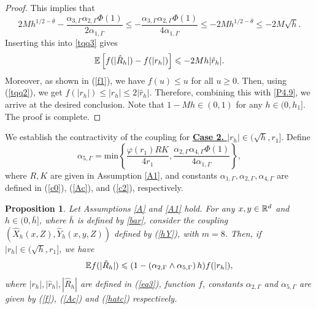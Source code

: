 \documentclass[aap]{imsart}
\theoremstyle{plain}
\newtheorem{proposition}{Proposition}
\theoremstyle{definition}
\begin{document}
\begin{proof}
This implies that
\begin{equation*}
2Mh^{1/2-\bar\theta}
-\frac{\alpha_{3,\Gamma}\alpha_{2, \Gamma}\Phi(1)}
{2\alpha_{1, \Gamma}}
\leqslant-\frac{\alpha_{3,\Gamma}\alpha_{2, \Gamma}\Phi(1)}
{4\alpha_{1, \Gamma}}\leqslant -2Mh^{1/2-\bar{\theta}}\leqslant -2M\sqrt{h}.
\end{equation*}
Inserting this into \eqref{tqq3} gives 
\begin{equation}\label{P4.9}
\mathbb{E} \left[f(|\hat{R}_h|)-f(|r_h|)\right]\leqslant -2Mh|\hat{r}_h|.
\end{equation}
Moreover, as shown in (\ref{f1}), we have $f(u)\leqslant u$ for all $u\geqslant 0$. Then, using (\ref{tqq2}), we get $f(|r_h|)\leqslant |r_h|\leqslant 2|\hat{r}_h|$.
Therefore, combining this with \eqref{P4.9}, we arrive at the desired conclusion. Note that $1-Mh\in(0, 1)$ for any $h\in(0, h_1]$. The proof is complete.
\end{proof}
			
We establish the contractivity of the coupling for \underline{\bf{Case 2. \textit{$|r_h|\in(\sqrt{h}, r_1]$}}}. Define 
\begin{equation}\label{hatc}
\alpha_{5, \Gamma}=\mathrm{min}\left\{\frac{\varphi(r_1)R K}{4r_1},\frac{\alpha_{2, \Gamma}\alpha_{4, \Gamma}\Phi(1)}{4\alpha_{1, \Gamma}}\right\},
\end{equation}
where \(R, K\) are given in Assumption \ref{A1}, and constants $\alpha_{1, \Gamma}, \alpha_{2, \Gamma}, \alpha_{4, \Gamma}$ are defined in (\ref{c0}), (\ref{Ac}), and (\ref{c2}), respectively.
\begin{proposition}\label{PR4}
Let Assumptions \ref{A} and \ref{A1} hold.
For any $x, y\in\mathbb{R}^d$ and \(h \in (0, \bar{h}]\), where $\bar{h}$ is defined by \eqref{bar}, consider the coupling $(\hat{X}_h(x,Z), \hat{Y}_h(x,y,Z))$ defined by (\ref{hY}), with $m=8$. Then, if $|r_h|\in(\sqrt{h}, r_1]$, we have
\begin{equation*}
\mathbb{E} f(|\hat{R}_h|)\leqslant (1-\left(\alpha_{2, \Gamma}\wedge\alpha_{5, \Gamma}\right)h)f(|r_h|),
\end{equation*}
where $|r_h|, |\hat{r}_h|, |\hat{R}_h|$ are defined in (\ref{eq3}), function $f$, constants $\alpha_{2, \Gamma}$ and $\alpha_{5, \Gamma}$ are given by (\ref{f}), (\ref{Ac}) and (\ref{hatc}) respectively.
\end{proposition}
			
\end{document}
